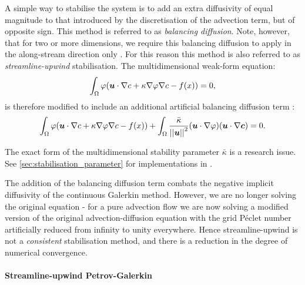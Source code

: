 A simple way to stabilise the system is to add an extra diffusivity of
equal magnitude to that introduced by the discretisation of the advection term,
but of opposite sign. This method is referred to as \textit{balancing diffusion}.
Note, however, that for two or more dimensions, we require this balancing
diffusion to apply in the along-stream direction only \citep{brooks1982, DoneaBook}.
For this reason this method is also referred to as \textit{streamline-upwind}
stabilisation. The multidimensional weak-form equation:
\begin{equation}\label{eqn:trivial_advdif_weak_md}
  \int_\Omega \varphi ({\mbox{\boldmath$u$}} \cdot \nabla c + \kappa \nabla \varphi \nabla c -f(x)) = 0,
\end{equation}
is therefore modified to include an additional artificial balancing diffusion
term \citep{DoneaBook}:
\begin{equation}\label{eqn:balancing_diffusion}
  \int_\Omega \varphi ({\mbox{\boldmath$u$}} \cdot \nabla c + \kappa \nabla \varphi \nabla c - f(x)) +
  \int_\Omega \frac{\bar{\kappa}}{\left|\left| {\mbox{\boldmath$u$}} \right|\right|^2}
  ({\mbox{\boldmath$u$}} \cdot \nabla \varphi) ({\mbox{\boldmath$u$}} \cdot \nabla {\mbox{\boldmath$c$}})
  = 0.
\end{equation}

The exact form of the multidimensional stability parameter $\bar{\kappa}$
is a research issue. See \ref{sec:stabilisation_parameter} for implementations in
\fluidity.

The addition of the balancing diffusion term combats the negative implicit
diffusivity of the continuous Galerkin method. However, we are no longer solving
the original equation - for a pure advection flow we are now solving a modified
version of the original advection-diffusion equation with the grid
P\'eclet number artificially reduced from
infinity to unity everywhere. Hence streamline-upwind is not a \textit{consistent}
stabilisation method, and there is a reduction in the degree of numerical
convergence.

\paragraph{Streamline-upwind Petrov-Galerkin}\label{sec:supg}


